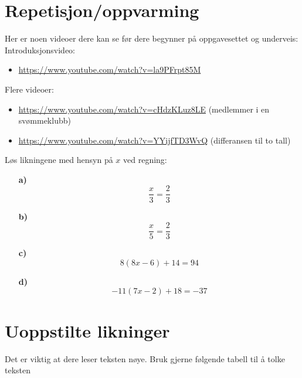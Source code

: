 \documentclass[a4, 11pt, twoside]{article}
\theoremstyle{definition}
\begin{document}
\section*{Repetisjon/oppvarming}
Her er noen videoer dere kan se før dere begynner på oppgavesettet og
underveis:
Introduksjonsvideo:
\begin{itemize}
  \item \url{https://www.youtube.com/watch?v=la9PFrpt85M}
\end{itemize}
Flere videoer:
\begin{itemize}
  \item \url{https://www.youtube.com/watch?v=cHdzKLuz8LE} (medlemmer i en svømmeklubb)
  \item \url{https://www.youtube.com/watch?v=YYijfTD3WvQ} (differansen til to tall)
\end{itemize}
\begin{Exercise}
Løs likningene med hensyn på $x$ ved regning: \newline
\begin{itemize}
\item[\bf a)] \[ \frac{x}{3} = \frac{2}{3} \]
\item[\bf b)] \[ \frac{x}{5} = \frac{2}{3} \]
\item[\bf c)] \[8(8x - 6) + 14 = 94 \]
\item[\bf d)] \[-11(7x - 2) + 18 = -37\]
\end{itemize}
\end{Exercise}


\section*{Uoppstilte likninger}
Det er viktig at dere leser teksten nøye. Bruk gjerne
følgende tabell til å tolke teksten
\end{document}

